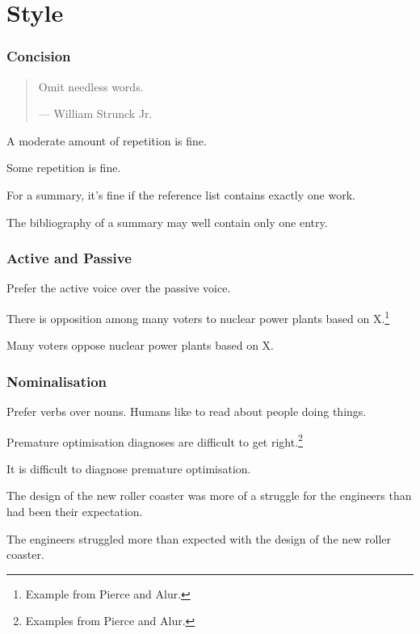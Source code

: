 \section{Style}

\begin{frame}
  \frametitle{Concision}

  \begin{quote}
    Omit needless words.

    --- William Strunck Jr.
  \end{quote}

  \medskip
  \pause


  A moderate amount of repetition is fine.


  Some repetition is fine.

  \medskip
  \pause


  For a summary, it's fine if the reference list contains exactly one work.


  The bibliography of a summary may well contain only one entry.
\end{frame}

\begin{frame}
  \frametitle{Active and Passive}

  Prefer the active voice over the passive voice.

  \medskip
  \pause


  There is opposition among many voters to nuclear power plants based on X.\footnote{Example from Pierce and Alur.}

  \medskip
  \pause


  Many voters oppose nuclear power plants based on X.
\end{frame}

\begin{frame}
  \frametitle{Nominalisation}

  Prefer verbs over nouns.
  Humans like to read about people doing things.

  \pause
  \medskip


  Premature optimisation diagnoses are difficult to get right.\footnote{Examples from Pierce and Alur.}

  \medskip
  \pause


  It is difficult to diagnose premature optimisation.

  \pause
  \medskip


  The design of the new roller coaster was more of a struggle for the engineers than had been their expectation.

  \medskip
  \pause


  The engineers struggled more than expected with the design of the new roller coaster.
\end{frame}

